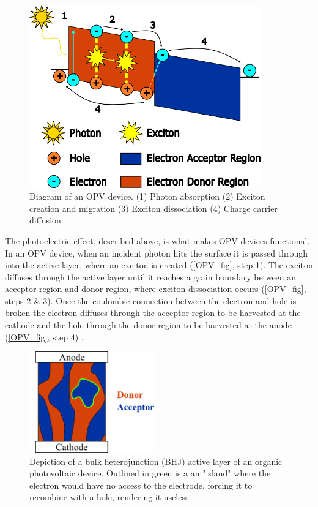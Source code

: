 \begin{figure}[ht]
    \centering
    \includegraphics[width=10cm]{src/figures/intro_figs/OPV_Figure.png}
    \caption{Diagram of an OPV device. (1) Photon absorption (2) Exciton creation and migration (3) Exciton dissociation (4) Charge carrier diffusion.}
    \label{OPV_fig}
\end{figure}
\par The photoelectric effect, described above, is what makes OPV devices functional. In an OPV device, when an incident photon hits the surface it is passed through into the active layer, where an exciton is created (\autoref{OPV_fig}, step 1). The exciton diffuses through the active layer until it reaches a grain boundary between an acceptor region and donor region, where exciton dissociation occurs (\autoref{OPV_fig}, steps 2 \& 3). Once the coulombic connection between the electron and hole is broken the electron diffuses through the acceptor region to be harvested at the cathode and the hole through the donor region to be harvested at the anode (\autoref{OPV_fig}, step 4) \citep{Zhang2018}. 
\begin{figure}
  \begin{center}
    \includegraphics[width=0.48\textwidth]{src/figures/intro_figs/bulk_heterojunction.png}
  \end{center}
    \caption{Depiction of a bulk heterojunction (BHJ) active layer of an organic photovoltaic device. Outlined in green is a an "island" where the electron would have no access to the electrode, forcing it to recombine with a hole, rendering it useless.}
  \label{BHJ}
\end{figure}

